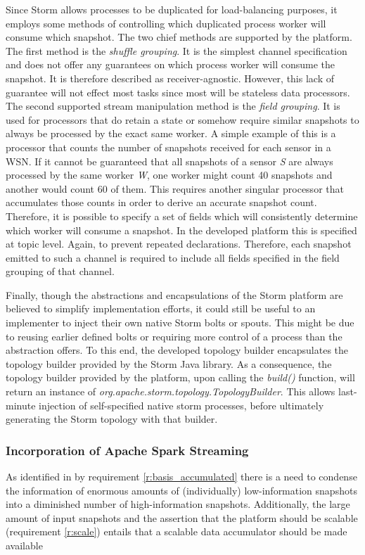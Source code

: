 

Since Storm allows processes to be duplicated for load-balancing purposes, it employs some methods of controlling which duplicated process worker will consume which snapshot. The two chief methods are supported by the platform. The first method is the \emph{shuffle grouping}. It is the simplest channel specification and does not offer any guarantees on which process worker will consume the snapshot. It is therefore described as receiver-agnostic. However, this lack of guarantee will not effect most tasks since most will be stateless data processors. The second supported stream manipulation method is the \emph{field grouping}. It is used for processors that do retain a state or somehow require similar snapshots to always be processed by the exact same worker. A simple example of this is a processor that counts the number of snapshots received for each sensor in a WSN. If it cannot be guaranteed that all snapshots of a sensor \emph{S} are always processed by the same worker \emph{W}, one worker might count 40 snapshots and another would count 60 of them. This requires another singular processor that accumulates those counts in order to derive an accurate snapshot count. Therefore, it is possible to specify a set of fields which will consistently determine which worker will consume a snapshot. In the developed platform this is specified at topic level. Again, to prevent repeated declarations. Therefore, each snapshot emitted to such a channel is required to include all fields specified in the field grouping of that channel.

Finally, though the abstractions and encapsulations of the Storm platform are believed to simplify implementation efforts, it could still be useful to an implementer to inject their own native Storm bolts or spouts. This might be due to reusing earlier defined bolts or requiring more control of a process than the abstraction offers. To this end, the developed topology builder encapsulates the topology builder provided by the Storm Java library. As a consequence, the topology builder provided by the platform, upon calling the \emph{build()} function, will return an instance of \emph{org.apache.storm.topology.TopologyBuilder}. This allows last-minute injection of self-specified native storm processes, before ultimately generating the Storm topology with that builder.

\subsubsection*{Incorporation of Apache Spark Streaming}
\label{sec:incorporation_spark}
As identified in by requirement \ref{r:basis_accumulated} there is a need to condense the information of enormous amounts of (individually) low-information snapshots into a diminished number of high-information snapshots. Additionally, the large amount of input snapshots and the assertion that the platform should be scalable (requirement \ref{r:scale}) entails that a scalable data accumulator should be made available

